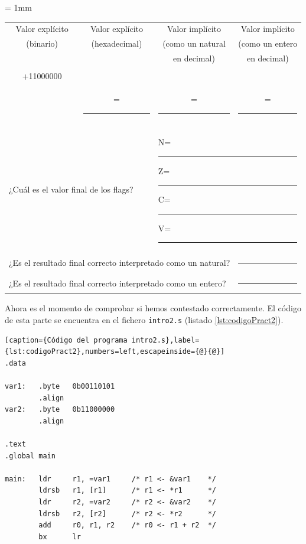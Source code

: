 \begin{center}
\small
\colorbox[gray]{0.9}{
\tabcolsep = 1mm
\begin{tabular}{cccc}
Valor explícito & Valor explícito & Valor implícito & Valor implícito \\
(binario) & (hexadecimal) & (como un natural & (como un entero \\
& & en decimal) & en decimal) \\
\colorbox[gray]{1}{
\begin{minipage}[b]{2cm}
\begin{flushright}
00110010\\
+11000000\\[-3mm]
\hrulefill
\end{flushright}
\vspace{0.4cm}
\end{minipage}
} &
= \colorbox[gray]{1}{\rule{0cm}{0.46cm}\rule{2cm}{0cm}} &
= \colorbox[gray]{1}{\rule{0cm}{0.46cm}\rule{2cm}{0cm}} &
= \colorbox[gray]{1}{\rule{0cm}{0.46cm}\rule{2cm}{0cm}} \\
\\
\multicolumn{2}{l}{
¿Cuál es el valor final de los flags?} &
\multicolumn{2}{l}{
\colorbox[gray]{1}{\rule{0cm}{0.46cm}N=\rule{0.7cm}{0cm}Z=\rule{0.7cm}{0cm}C=\rule{0.7cm}{0cm}V=\rule{0.7cm}{0cm}}
}\\[1mm]
\multicolumn{3}{l}{
¿Es el resultado final correcto interpretado como un natural?} &
\multicolumn{1}{l}{
\colorbox[gray]{1}{\rule{1cm}{0cm}\rule{0cm}{0.46cm}}} \\[1mm]
\multicolumn{3}{l}{
¿Es el resultado final correcto interpretado como un entero?} &
\multicolumn{1}{l}{
\colorbox[gray]{1}{\rule{1cm}{0cm}\rule{0cm}{0.46cm}}} \\
\end{tabular}
}
\end{center}

Ahora es el momento de comprobar si hemos contestado correctamente.
El código de esta parte se encuentra en el fichero {\tt intro2.s}
(listado \ref{lst:codigoPract2}).

\begin{lstlisting}[caption={Código del programa intro2.s},label={lst:codigoPract2},numbers=left,escapeinside={@}{@}]
.data

var1:   .byte   0b00110101
        .align
var2:   .byte   0b11000000
        .align

.text
.global main
 
main:   ldr     r1, =var1     /* r1 <- &var1    */
        ldrsb   r1, [r1]      /* r1 <- *r1      */
        ldr     r2, =var2     /* r2 <- &var2    */
        ldrsb   r2, [r2]      /* r2 <- *r2      */
        add     r0, r1, r2    /* r0 <- r1 + r2  */
        bx      lr
\end{lstlisting}


